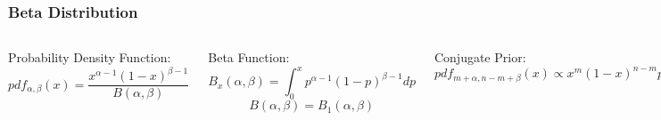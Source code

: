 \documentclass{beamer}
\begin{document}
\begin{frame}
  \frametitle{Beta Distribution}

\begin{columns}

\column{2in}
  
  Probability Density Function:
  $$
    pdf_{\alpha, \beta}(x) = \frac{x^{\alpha - 1} (1-x)^{\beta - 1}}
    {B(\alpha, \beta)}
  $$

  Beta Function:
  $$
  B_x(\alpha, \beta) = \int_0^x p^{\alpha - 1}(1-p)^{\beta - 1} dp
  $$
  $$
  B(\alpha, \beta) = B_1(\alpha, \beta)
  $$

  \alert{Conjugate Prior:}
  $$
  pdf_{m+\alpha, n-m+\beta}(x)
  \propto
  x^m (1-x)^{n-m} pdf_{\alpha, \beta}(x)
  $$
  
\column{2in}
  
  \includegraphics[scale=0.2]{images/Beta_distributions.png}

\end{columns}

\end{frame}
\end{document}
